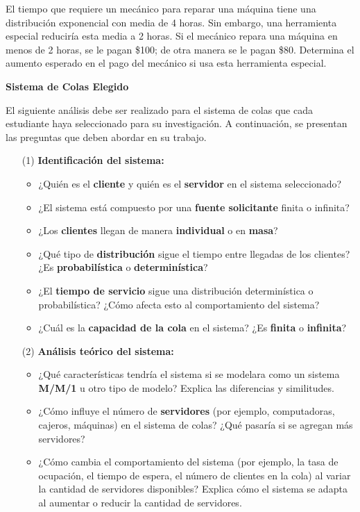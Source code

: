 \documentclass{article}
\begin{document}
\begin{problem}
    El tiempo que requiere un mecánico para reparar una máquina tiene una distribución exponencial con media de 4 horas. Sin embargo, una herramienta especial reduciría esta media a 2 horas. Si el mecánico repara una máquina en menos de 2 horas, se le pagan \$100; de otra manera se le pagan \$80. Determina el aumento esperado en el pago del mecánico si usa esta herramienta especial.
\end{problem}
\newpage

\begin{problem}
    \textbf{Sistema de Colas Elegido}

El siguiente análisis debe ser realizado para el sistema de colas que cada estudiante haya seleccionado para su investigación. A continuación, se presentan las preguntas que deben abordar en su trabajo.

\begin{itemize}
    \item [(1)] \textbf{Identificación del sistema:}
    \begin{itemize}
        \item ¿Quién es el \textbf{cliente} y quién es el \textbf{servidor} en el sistema seleccionado?
        \item ¿El sistema está compuesto por una \textbf{fuente solicitante} finita o infinita?
        \item ¿Los \textbf{clientes} llegan de manera \textbf{individual} o en \textbf{masa}?
        \item ¿Qué tipo de \textbf{distribución} sigue el tiempo entre llegadas de los clientes? ¿Es \textbf{probabilística} o \textbf{determinística}?
        \item ¿El \textbf{tiempo de servicio} sigue una distribución determinística o probabilística? ¿Cómo afecta esto al comportamiento del sistema?
        \item ¿Cuál es la \textbf{capacidad de la cola} en el sistema? ¿Es \textbf{finita} o \textbf{infinita}?
    \end{itemize}
    
    \item [(2)] \textbf{Análisis teórico del sistema:}
    \begin{itemize}
        \item ¿Qué características tendría el sistema si se modelara como un sistema \textbf{M/M/1} u otro tipo de modelo? Explica las diferencias y similitudes.
        \item ¿Cómo influye el número de \textbf{servidores} (por ejemplo, computadoras, cajeros, máquinas) en el sistema de colas? ¿Qué pasaría si se agregan más servidores?
        \item ¿Cómo cambia el comportamiento del sistema (por ejemplo, la tasa de ocupación, el tiempo de espera, el número de clientes en la cola) al variar la cantidad de servidores disponibles? Explica cómo el sistema se adapta al aumentar o reducir la cantidad de servidores.
    \end{itemize}
    

\end{itemize}
\end{problem}
\end{document}
